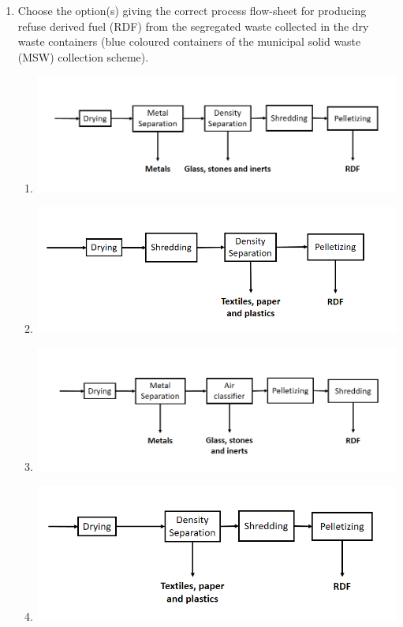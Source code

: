 \documentclass[journal]{IEEEtran}
\begin{document}
\begin{enumerate}[resume]
\item Choose the option(s) giving the correct process flow-sheet for producing refuse derived fuel (RDF) from the segregated waste collected in the dry waste containers (blue coloured containers of the municipal solid waste (MSW) collection scheme).
\hfill{}
\begin{enumerate}
\item \includegraphics[width=\columnwidth]{figs/fig7.png}
\item \includegraphics[width=\columnwidth]{figs/fig8.png}
\item \includegraphics[width=\columnwidth]{figs/fig9.png}
\item \includegraphics[width=\columnwidth]{figs/fig10.png}
\end{enumerate}


\end{enumerate}
\end{document}
